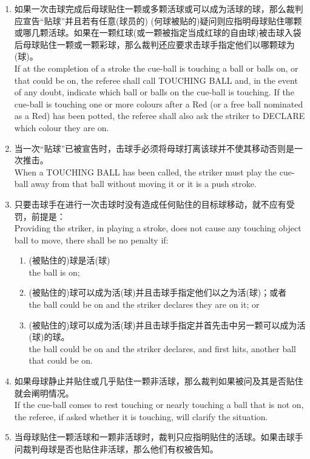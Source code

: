 \begin{enumerate}[label=(\alph*)]
    \item 如果一次击球完成后母球贴住一颗或多颗活球或可以成为活球的球，那么裁判应宣告``贴球''并且若有任意(球员的) (何球被贴的)疑问则应指明母球贴住哪颗或哪几颗活球。如果在一颗红球(或一颗被指定当成红球的自由球)被击球入袋后母球贴住一颗或一颗彩球，那么裁判还应要求击球手指定他们以哪颗球为(球)。\\
    If at the completion of a stroke the cue-ball is touching a ball or balls on, or that could be on, the referee shall call TOUCHING BALL and, in the event of any doubt, indicate which ball or balls on the cue-ball is touching. If the cue-ball is touching one or more colours after a Red (or a free ball nominated as a Red) has been potted, the referee shall also ask the striker to DECLARE which colour they are on.
    \item 当一次``贴球''已被宣告时，击球手必须将母球打离该球并不使其移动否则是一次推击。\\
    When a TOUCHING BALL has been called, the striker must play the cue-ball away from that ball without moving it or it is a push stroke.
    \item 只要击球手在进行一次击球时没有造成任何贴住的目标球移动，就不应有受罚，前提是：\\
    Providing the striker, in playing a stroke, does not cause any touching object ball to move, there shall be no penalty if:
    \begin{enumerate}[label=(\roman*)]
        \item (被贴住的)球是活(球)\\
        the ball is on;
        \item (被贴住的)球可以成为活(球)并且击球手指定他们以之为活(球)；或者\\
        the ball could be on and the striker declares they are on it; or
        \item (被贴住的)球可以成为活(球)并且击球手指定并首先击中另一颗可以成为活(球)的球。\\
        the ball could be on and the striker declares, and first hits, another ball that could be on.
    \end{enumerate}
    \item 如果母球静止并贴住或几乎贴住一颗非活球，那么裁判如果被问及其是否贴住就会阐明情况。\\
    If the cue-ball comes to rest touching or nearly touching a ball that is not on, the referee, if asked whether it is touching, will clarify the situation.
    \item 当母球贴住一颗活球和一颗非活球时，裁判只应指明贴住的活球。如果击球手问裁判母球是否也贴住非活球，那么他们有权被告知。\\

\end{enumerate}
